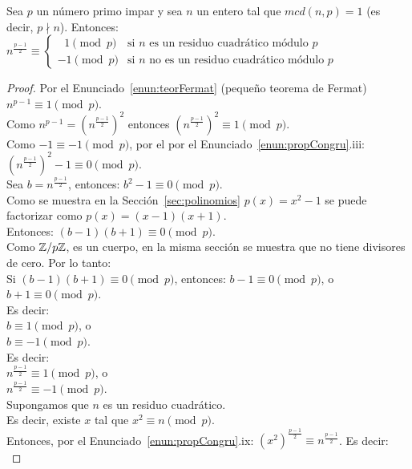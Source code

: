 \begin{enunciado}\label{enun:criterioEuler}\leavevmode\par
Sea $p$ un número primo impar y sea $n$ un entero tal que $mcd(n,p) = 1$ (es decir, $p \nmid n$). Entonces: \\
$n^{\frac{p-1}{2}} \equiv
\begin{cases}
\,\,\; 1 \pmod{p} & \text{si } n \text{ es un residuo cuadrático módulo } p \\
-1 \pmod{p} & \text{si } n \text{ no es un residuo cuadrático módulo } p
\end{cases}$
\end{enunciado}

\begin{proof}
Por el Enunciado~\ref{enun:teorFermat} (pequeño teorema de Fermat) $n^{p-1} \equiv 1 \pmod p$. \\
Como $n^{p-1} = \left(n^{\frac{p-1}{2}}\right)^2$ entonces $\left(n^{\frac{p-1}{2}}\right)^2 \equiv 1 \pmod{p}$. \\
Como $-1 \equiv -1 \pmod{p}$, por el por el Enunciado~\ref{enun:propCongru}.iii: $\left(n^{\frac{p-1}{2}}\right)^2 - 1 \equiv 0 \pmod{p}$. \\
Sea $b = n^{\frac{p-1}{2}}$, entonces: $b^2 - 1 \equiv 0 \pmod{p}$. \\
Como se muestra en la Sección~\ref{sec:polinomios} $p(x)=x^2 - 1$ se puede factorizar como $p(x) = (x-1)(x+1)$. \\
Entonces: $(b-1)(b+1) \equiv 0 \pmod{p}$. \\
Como $\mathbb{Z}/p\mathbb{Z}$, es un cuerpo, en la misma sección se muestra que no tiene divisores de cero. Por lo tanto: \\
Si $(b-1)(b+1) \equiv 0 \pmod{p}$, entonces: $b-1 \equiv 0 \pmod{p}$, o $b+1 \equiv 0 \pmod{p}$. \\
Es decir: \\
$b \equiv 1 \pmod{p}$, o \\
$b \equiv -1 \pmod{p}$. \\
Es decir: \\
$n^{\frac{p-1}{2}} \equiv 1 \pmod{p}$, o \\
$n^{\frac{p-1}{2}} \equiv -1 \pmod{p}$. \\
Supongamos que $n$ es un residuo cuadrático. \\
Es decir, existe $x$ tal que $x^2 \equiv n \pmod{p}$. \\
Entonces, por el Enunciado~\ref{enun:propCongru}.ix: $(x^2)^{\frac{p-1}{2}} \equiv n^{\frac{p-1}{2}}$. Es decir: \\

\end{proof}
